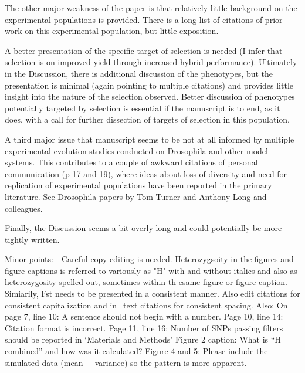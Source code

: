 \documentclass[onecolumn,oneside,letterpaper]{article}
\begin{document}
{

The other major weakness of the paper is that relatively little background on the experimental populations 
is provided. There is a long list of citations of prior work on this experimental population, but little 
exposition.


 A better presentation of the specific target of selection is needed (I infer that selection is on 
improved yield through increased hybrid performance). Ultimately in the Discussion, there is additional 
discussion of the phenotypes, but the presentation is minimal (again pointing to multiple citations) and 
provides little insight into the nature of the selection observed. Better discussion of phenotypes potentially 
targeted by selection is essential if the manuscript is to end, as it does, with a call for further dissection of 
targets of selection in this population.


A third major issue that manuscript seems to be not at all informed by multiple experimental evolution 
studies conducted on Drosophila and other model systems. This contributes to a couple of awkward 
citations of personal communication (p 17 and 19), where ideas about loss of diversity and need for 
replication of experimental populations have been reported in the primary literature. See Drosophila papers 
by Tom Turner and Anthony Long and colleagues.


Finally, the Discussion seems a bit overly long and could potentially be more tightly written.


Minor points: 
- Careful copy editing is needed. Heterozygsoity in the figures and figure captions is referred to variously 
as "H" with and without italics and also as heterozygosity spelled out, sometimes within th esame figure or 
figure caption. Simiarily, Fst needs to be presented in a consistent manner. Also edit citations for 
consistent capitalization and in=text citations for consistent spacing. Also:
On page 7, line 10: A sentence should not begin with a number.
Page 10, line 14: Citation format is incorrect. 
Page 11, line 16: Number of SNPs passing filters should be reported in ‘Materials and Methods’
Figure 2 caption: What is “H combined” and how was it calculated?
Figure 4 and 5: Please include the simulated data (mean + variance) so the pattern is more apparent.

}
\end{document}

